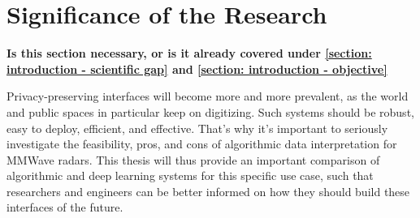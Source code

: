 \section{Significance of the Research}
\label{section: introduction - significance of the research}
\textbf{Is this section necessary, or is it already covered under \cref{section: introduction - scientific gap} and \cref{section: introduction - objective}}

Privacy-preserving interfaces will become more and more prevalent, as the world and public spaces in particular keep on digitizing.
Such systems should be robust, easy to deploy, efficient, and effective.
That's why it's important to seriously investigate the feasibility, pros, and cons of algorithmic data interpretation for MMWave radars.
This thesis will thus provide an important comparison of algorithmic and deep learning systems for this specific use case, such that researchers and engineers can be better informed on how they should build these interfaces of the future.

